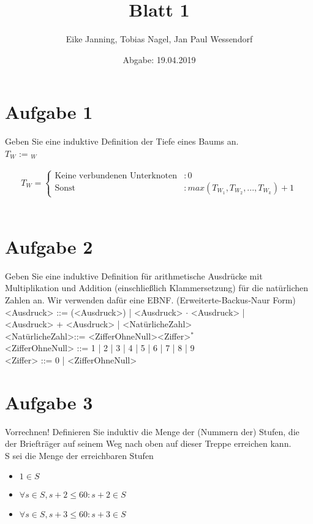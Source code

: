 \documentclass[paper = a4, ngerman]{scrartcl}
\title{Blatt 1}
\author{Eike Janning, Tobias Nagel, Jan Paul Wessendorf}
\date{Abgabe: 19.04.2019}
\begin{document}
\maketitle
\hrulefill

\section*{Aufgabe 1}

Geben Sie eine induktive Definition der Tiefe eines Baums an.\\
$T_W$ :=  $_W$

	\begin{align*}
		T_W =
		\begin{cases}
			\text{Keine verbundenen Unterknoten} &: 0\\
			\text{Sonst} &: max(T_{W_1}, T_{W_2}, ..., T_{W_k}) + 1
		\end{cases}
	\end{align*}\\

\section*{Aufgabe 2}
	 Geben Sie eine induktive Definition für arithmetische Ausdrücke mit Multiplikation und Addition (einschließlich Klammersetzung) für die natürlichen Zahlen an. Wir verwenden dafür eine EBNF. (Erweiterte-Backus-Naur Form)\\
	 

<Ausdruck> ::= (<Ausdruck>) | <Ausdruck> $\cdot$ <Ausdruck> |\\ 
 \hspace*{31mm}<Ausdruck> + <Ausdruck> | <NatürlicheZahl> \\

<NatürlicheZahl>::= <ZifferOhneNull><Ziffer>$^*$\\

<ZifferOhneNull> ::= 1 | 2 | 3 | 4 | 5 | 6 | 7 | 8 | 9\\

<Ziffer> ::= 0 | <ZifferOhneNull>

	 	
\pagebreak%

\section*{Aufgabe 3}
Vorrechnen! Definieren Sie induktiv die Menge der (Nummern der) Stufen, die der Briefträger auf seinem Weg nach oben auf dieser Treppe erreichen kann.\\
S sei die Menge der erreichbaren Stufen
\begin{itemize}
	\item $1 \in S$
	\item $\forall s \in S, s+2 \le 60 : s + 2 \in S$
	\item $\forall s \in S, s+3 \le 60 : s + 3 \in S$
\end{itemize}
\end{document}
